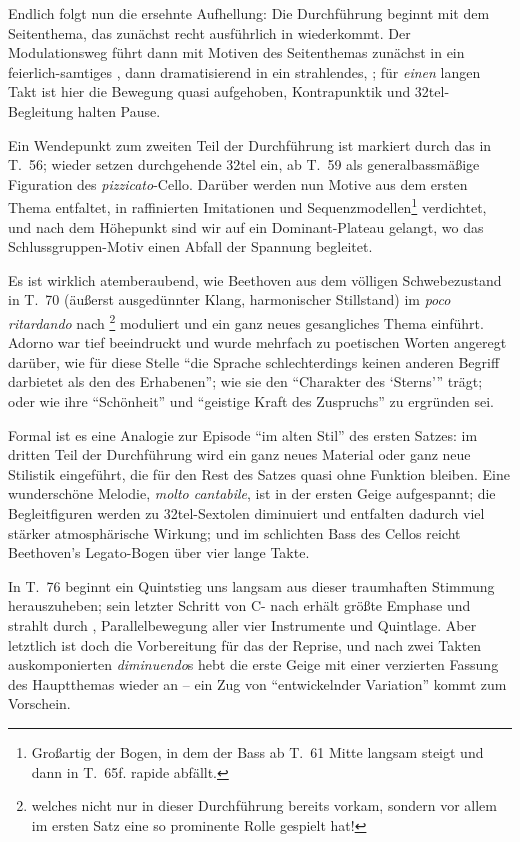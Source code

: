 Endlich folgt nun die ersehnte Aufhellung: Die Durchführung
beginnt mit dem Seitenthema, das zunächst recht ausführlich in
 wiederkommt.  Der Modulationsweg führt dann
mit Motiven des Seitenthemas zunächst in ein feierlich-samtiges
, dann dramatisierend in ein strahlendes,
 ; für \emph{einen} langen Takt ist
hier die Bewegung quasi aufgehoben, Kontrapunktik und 32tel-Begleitung
halten Pause.

Ein Wendepunkt zum zweiten Teil der Durchführung ist markiert
durch das  in T.~56; wieder setzen durchgehende
32tel ein, ab T.~59 als generalbassmäßige Figuration des
\textit{pizzicato}-Cello.  Darüber werden nun Motive aus dem
ersten Thema entfaltet, in raffinierten Imitationen und
Sequenzmodellen\footnote{Großartig der Bogen, in dem der Bass
ab T.~61 Mitte langsam steigt und dann in T.~65f. rapide abfällt.}
verdichtet, und nach dem Höhepunkt sind wir auf ein Dominant-Plateau
gelangt, wo das Schlussgruppen-Motiv einen Abfall der Spannung
begleitet.

Es ist wirklich atemberaubend, wie Beethoven aus dem völligen
Schwebezustand in T.~70 (äußerst ausgedünnter Klang, harmonischer
Stillstand) im \textit{poco ritardando} nach \footnote{
welches nicht nur in dieser Durchführung bereits vorkam, sondern vor
allem im ersten Satz eine so prominente Rolle gespielt hat!}
moduliert und ein ganz neues gesangliches Thema einführt.  Adorno
war tief beeindruckt und wurde mehrfach zu poetischen Worten angeregt darüber,
wie für diese Stelle \enquote{die Sprache schlechterdings keinen anderen
Begriff darbietet als den des Erhabenen}\cite[S.~261]{adorno}; wie
sie den \enquote{Charakter des \enquote{Sterns}} trägt\cite[Nr. 357]{adorno};
oder wie ihre \enquote{Schönheit} und \enquote{geistige Kraft des
Zuspruchs} zu ergründen sei\cite[Fußnoten 290 und 291]{adorno}.

Formal ist es eine Analogie zur Episode \enquote{im alten Stil} des ersten
Satzes: im dritten Teil der Durchführung wird ein ganz neues Material
oder ganz neue Stilistik eingeführt, die für den Rest des Satzes quasi
ohne Funktion bleiben.  Eine wunderschöne Melodie, \textit{molto cantabile},
ist in der ersten Geige aufgespannt; die Begleitfiguren werden zu
32tel-Sextolen diminuiert und entfalten dadurch viel stärker atmosphärische
Wirkung; und im schlichten Bass des Cellos reicht Beethoven’s Legato-Bogen
über vier lange Takte.

In T.~76 beginnt ein Quintstieg uns langsam aus dieser traumhaften
Stimmung herauszuheben; sein letzter Schritt von C- nach 
erhält größte Emphase und strahlt durch , Parallelbewegung
aller vier Instrumente und Quintlage.  Aber letztlich ist 
doch die Vorbereitung für das  der Reprise, und nach
zwei Takten auskomponierten \textit{diminuendo}s hebt die erste Geige
mit einer verzierten Fassung des Hauptthemas wieder an – ein Zug von
\enquote{entwickelnder Variation} kommt zum Vorschein.

